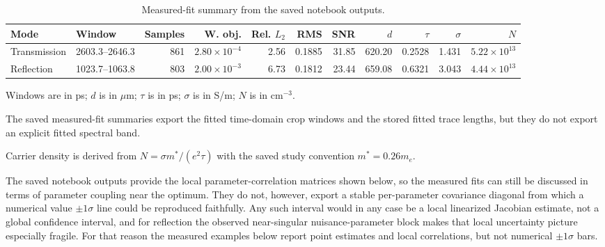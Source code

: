 \documentclass[11pt]{article}
\newcommand{\mstar}{m^\ast}
\begin{document}
\begin{table}[H]
\centering
\begin{threeparttable}
\caption{Measured-fit summary from the saved notebook outputs.}
\label{tab:measured-fit-summary-revised}
\scriptsize
\setlength{\tabcolsep}{4pt}
\begin{tabular*}{\linewidth}{@{\extracolsep{\fill}}llrrrrrrrrr@{}}
\toprule
Mode & Window & Samples & W. obj. & Rel. \(L_2\) & RMS & SNR & \(d\) & \(\tau\) & \(\sigma\) & \(N\) \\
\midrule
Transmission & 2603.3--2646.3 & 861 & \(2.80\times10^{-4}\) & 2.56 & 0.1885 & 31.85 & 620.20 & 0.2528 & 1.431 & \(5.22\times10^{13}\) \\
Reflection & 1023.7--1063.8 & 803 & \(2.00\times10^{-3}\) & 6.73 & 0.1812 & 23.44 & 659.08 & 0.6321 & 3.043 & \(4.44\times10^{13}\) \\
\bottomrule
\end{tabular*}
\begin{tablenotes}[flushleft]
\footnotesize
\item Windows are in ps; \(d\) is in \(\mu\)m; \(\tau\) is in ps; \(\sigma\) is in S/m; \(N\) is in cm\(^{-3}\).
\item The saved measured-fit summaries export the fitted time-domain crop windows and the stored fitted trace lengths, but they do not export an explicit fitted spectral band.
\item Carrier density is derived from \(N=\sigma \mstar/(e^2\tau)\) with the saved study convention \(\mstar=0.26m_e\).
\end{tablenotes}
\end{threeparttable}
\end{table}

The saved notebook outputs provide the local parameter-correlation matrices shown below, so the measured fits can still be discussed in terms of parameter coupling near the optimum. They do not, however, export a stable per-parameter covariance diagonal from which a numerical value \(\pm 1\sigma\) line could be reproduced faithfully. Any such interval would in any case be a local linearized Jacobian estimate, not a global confidence interval, and for reflection the observed near-singular nuisance-parameter block makes that local uncertainty picture especially fragile. For that reason the measured examples below report point estimates and local correlations, but not numerical \(\pm 1\sigma\) bars.
\end{document}
